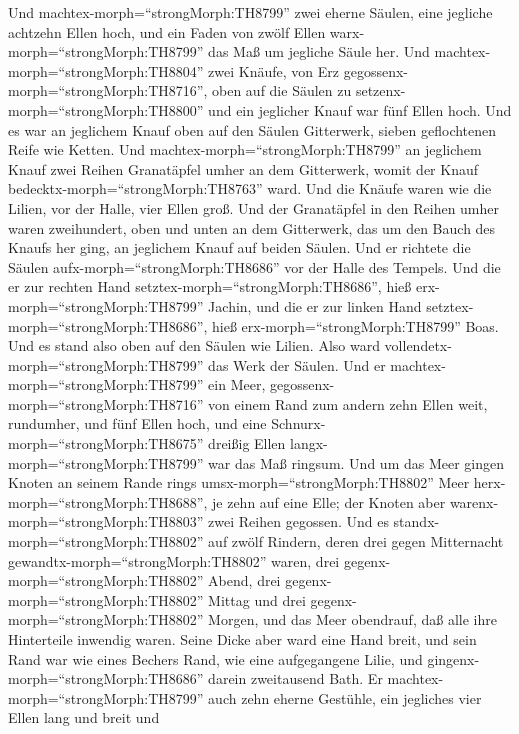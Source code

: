 Und machtex-morph=``strongMorph:TH8799'' zwei eherne Säulen, eine
jegliche achtzehn Ellen hoch, und ein Faden von zwölf Ellen
warx-morph=``strongMorph:TH8799'' das Maß um jegliche Säule her.
 Und machtex-morph=``strongMorph:TH8804'' zwei Knäufe, von
Erz gegossenx-morph=``strongMorph:TH8716'', oben auf die Säulen zu
setzenx-morph=``strongMorph:TH8800'' und ein jeglicher Knauf war fünf
Ellen hoch.  Und es war an jeglichem Knauf oben auf den
Säulen Gitterwerk, sieben geflochtenen Reife wie Ketten. 
Und machtex-morph=``strongMorph:TH8799'' an jeglichem Knauf zwei Reihen
Granatäpfel umher an dem Gitterwerk, womit der Knauf
bedecktx-morph=``strongMorph:TH8763'' ward.  Und die Knäufe
waren wie die Lilien, vor der Halle, vier Ellen groß.  Und
der Granatäpfel in den Reihen umher waren zweihundert, oben und unten an
dem Gitterwerk, das um den Bauch des Knaufs her ging, an jeglichem Knauf
auf beiden Säulen.  Und er richtete die Säulen
aufx-morph=``strongMorph:TH8686'' vor der Halle des Tempels. Und die er
zur rechten Hand setztex-morph=``strongMorph:TH8686'', hieß
erx-morph=``strongMorph:TH8799'' Jachin, und die er zur linken Hand
setztex-morph=``strongMorph:TH8686'', hieß
erx-morph=``strongMorph:TH8799'' Boas.  Und es stand also
oben auf den Säulen wie Lilien. Also ward
vollendetx-morph=``strongMorph:TH8799'' das Werk der Säulen.
 Und er machtex-morph=``strongMorph:TH8799'' ein Meer,
gegossenx-morph=``strongMorph:TH8716'' von einem Rand zum andern zehn
Ellen weit, rundumher, und fünf Ellen hoch, und eine
Schnurx-morph=``strongMorph:TH8675'' dreißig Ellen
langx-morph=``strongMorph:TH8799'' war das Maß ringsum. 
Und um das Meer gingen Knoten an seinem Rande rings
umsx-morph=``strongMorph:TH8802'' Meer
herx-morph=``strongMorph:TH8688'', je zehn auf eine Elle; der Knoten
aber warenx-morph=``strongMorph:TH8803'' zwei Reihen gegossen.
 Und es standx-morph=``strongMorph:TH8802'' auf zwölf
Rindern, deren drei gegen Mitternacht
gewandtx-morph=``strongMorph:TH8802'' waren, drei
gegenx-morph=``strongMorph:TH8802'' Abend, drei
gegenx-morph=``strongMorph:TH8802'' Mittag und drei
gegenx-morph=``strongMorph:TH8802'' Morgen, und das Meer obendrauf, daß
alle ihre Hinterteile inwendig waren.  Seine Dicke aber
ward eine Hand breit, und sein Rand war wie eines Bechers Rand, wie eine
aufgegangene Lilie, und gingenx-morph=``strongMorph:TH8686'' darein
zweitausend Bath.  Er machtex-morph=``strongMorph:TH8799''
auch zehn eherne Gestühle, ein jegliches vier Ellen lang und breit und
